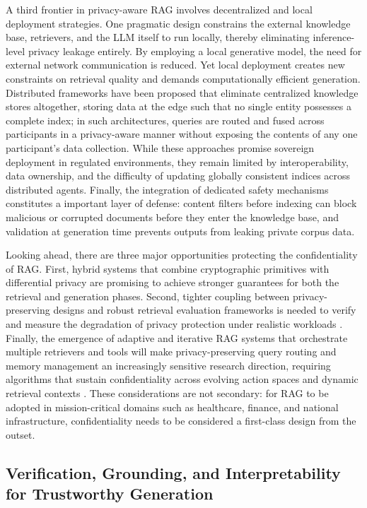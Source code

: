 \documentclass[11pt,a4paper]{article}
\begin{document}
A third frontier in privacy-aware RAG involves decentralized and local deployment strategies. One pragmatic design constrains the external knowledge base, retrievers, and the LLM itself to run locally, thereby eliminating inference-level privacy leakage entirely. By employing a local generative model, the need for external network communication is reduced. Yet local deployment creates new constraints on retrieval quality and demands computationally efficient generation. Distributed frameworks have been proposed that eliminate centralized knowledge stores altogether, storing data at the edge such that no single entity possesses a complete index; in such architectures, queries are routed and fused across participants in a privacy-aware manner without exposing the contents of any one participant's data collection. While these approaches promise sovereign deployment in regulated environments, they remain limited by interoperability, data ownership, and the difficulty of updating globally consistent indices across distributed agents. Finally, the integration of dedicated safety mechanisms constitutes a important layer of defense: content filters before indexing can block malicious or corrupted documents before they enter the knowledge base, and validation at generation time prevents outputs from leaking private corpus data.

Looking ahead, there are three major opportunities protecting the confidentiality of RAG. First, hybrid systems that combine cryptographic primitives with differential privacy are promising to achieve stronger guarantees for both the retrieval and generation phases. Second, tighter coupling between privacy-preserving designs and robust retrieval evaluation frameworks is needed to verify and measure the degradation of privacy protection under realistic workloads \cite{arxiv:2510.12323v1,arxiv:2510.12323v1}. Finally, the emergence of adaptive and iterative RAG systems that orchestrate multiple retrievers and tools will make privacy-preserving query routing and memory management an increasingly sensitive research direction, requiring algorithms that sustain confidentiality across evolving action spaces and dynamic retrieval contexts \cite{arxiv:2510.12323v1,arxiv:2510.12323v1}. These considerations are not secondary: for RAG to be adopted in mission-critical domains such as healthcare, finance, and national infrastructure, confidentiality needs to be considered a first-class design from the outset.


\subsection{Verification, Grounding, and Interpretability for Trustworthy Generation}
\end{document}
